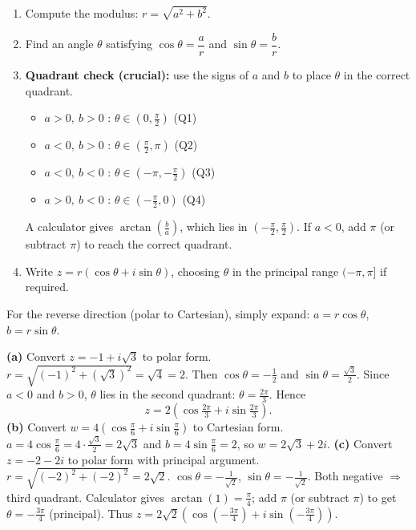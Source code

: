 \documentclass[11pt]{article}
\begin{document}
\begin{methode}[Converting $z = a + ib$ to polar form]
\begin{enumerate}
\item Compute the modulus: $r = \sqrt{a^2 + b^2}$.
\item Find an angle $\theta$ satisfying $\cos\theta = \dfrac{a}{r}$ and $\sin\theta = \dfrac{b}{r}$.
\item \textbf{Quadrant check (crucial):} use the signs of $a$ and $b$ to place $\theta$ in the correct quadrant.
  \begin{itemize}
  \item $a > 0,\ b > 0$ : $\theta \in (0, \tfrac{\pi}{2})$ (Q1)
  \item $a < 0,\ b > 0$ : $\theta \in (\tfrac{\pi}{2}, \pi)$ (Q2)
  \item $a < 0,\ b < 0$ : $\theta \in (-\pi, -\tfrac{\pi}{2})$ (Q3)
  \item $a > 0,\ b < 0$ : $\theta \in (-\tfrac{\pi}{2}, 0)$ (Q4)
  \end{itemize}
  A calculator gives $\arctan\!\left(\tfrac{b}{a}\right)$, which lies in $(-\tfrac{\pi}{2}, \tfrac{\pi}{2})$. If $a < 0$, add $\pi$ (or subtract $\pi$) to reach the correct quadrant.
\item Write $z = r(\cos\theta + i\sin\theta)$, choosing $\theta$ in the principal range $(-\pi, \pi]$ if required.
\end{enumerate}
For the reverse direction (polar to Cartesian), simply expand: $a = r\cos\theta$, $b = r\sin\theta$.
\end{methode}

\begin{exemplebox}
\textbf{(a)} Convert $z = -1 + i\sqrt{3}$ to polar form.\\
$r = \sqrt{(-1)^2 + (\sqrt{3})^2} = \sqrt{4} = 2$. Then $\cos\theta = -\tfrac{1}{2}$ and $\sin\theta = \tfrac{\sqrt{3}}{2}$. Since $a < 0$ and $b > 0$, $\theta$ lies in the second quadrant: $\theta = \tfrac{2\pi}{3}$. Hence
\[ z = 2\left(\cos\tfrac{2\pi}{3} + i\sin\tfrac{2\pi}{3}\right). \]
\textbf{(b)} Convert $w = 4\left(\cos\tfrac{\pi}{6} + i\sin\tfrac{\pi}{6}\right)$ to Cartesian form.\\
$a = 4\cos\tfrac{\pi}{6} = 4\cdot\tfrac{\sqrt{3}}{2} = 2\sqrt{3}$ and $b = 4\sin\tfrac{\pi}{6} = 2$, so $w = 2\sqrt{3} + 2i$.
\textbf{(c)} Convert $z = -2 - 2i$ to polar form with principal argument.\\
$r = \sqrt{(-2)^2 + (-2)^2} = 2\sqrt{2}$. $\cos\theta = -\tfrac{1}{\sqrt{2}}$, $\sin\theta = -\tfrac{1}{\sqrt{2}}$. Both negative $\Rightarrow$ third quadrant. Calculator gives $\arctan(1) = \tfrac{\pi}{4}$; add $\pi$ (or subtract $\pi$) to get $\theta = -\tfrac{3\pi}{4}$ (principal). Thus $z = 2\sqrt{2}\left(\cos\left(-\tfrac{3\pi}{4}\right) + i\sin\left(-\tfrac{3\pi}{4}\right)\right)$.
\end{exemplebox}
\end{document}
